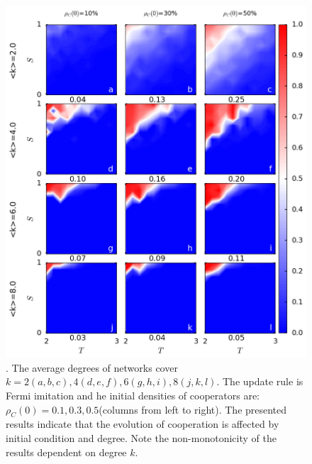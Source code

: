 \documentclass[preprint,12pt,3p]{elsarticle}
\begin{document}
\begin{figure}[htbp]
\centering
\includegraphics[width=12cm]{powerlawK2468TSPanel.png}

\caption{\cooplevel.
The average degrees of networks cover $k=2(a,b,c),4(d,e,f),6(g,h,i),8(j,k,l)$.
The update rule is Fermi imitation and he initial densities of cooperators are:
$\rho_{C}(0)=0.1,0.3,0.5$(columns from left to right).
The presented results indicate that the evolution of cooperation is affected by initial condition and degree.
Note the non-monotonicity of the results dependent on degree $k$.}
\label{powerlawK2468TSPanel}
\end{figure}
\end{document}

